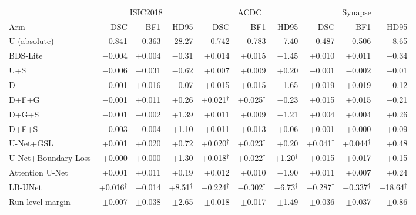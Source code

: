 \begin{tabular}{lrrrrrrrrr}
\toprule
 & \multicolumn{3}{c}{ISIC2018} & \multicolumn{3}{c}{ACDC} & \multicolumn{3}{c}{Synapse} \\
\cmidrule(lr){2-4}\cmidrule(lr){5-7}\cmidrule(lr){8-10}
Arm & DSC & BF1 & HD95 & DSC & BF1 & HD95 & DSC & BF1 & HD95 \\
\midrule
U (absolute) & 0.841 & 0.363 & 28.27 & 0.742 & 0.783 & 7.40 & 0.487 & 0.506 & 8.65 \\
\midrule
BDS-Lite & $-$0.004 & +0.004 & $-$0.31 & +0.014 & +0.015 & $-$1.45 & +0.010 & +0.011 & $-$0.34 \\
\midrule
U+S & $-$0.006 & $-$0.031 & $-$0.62 & +0.007 & +0.009 & +0.20 & $-$0.001 & $-$0.002 & $-$0.01 \\
D & $-$0.001 & +0.016 & $-$0.07 & +0.015 & +0.015 & $-$1.65 & +0.019 & +0.019 & $-$0.12 \\
D+F+G & $-$0.001 & +0.011 & +0.26 & +0.021$^{\dagger}$ & +0.025$^{\dagger}$ & $-$0.23 & +0.015 & +0.015 & $-$0.21 \\
D+G+S & $-$0.001 & $-$0.002 & +1.39 & +0.011 & +0.009 & $-$1.21 & +0.004 & +0.004 & +0.26 \\
D+F+S & $-$0.003 & $-$0.004 & +1.10 & +0.011 & +0.013 & +0.06 & +0.001 & +0.000 & +0.09 \\
\midrule
U-Net+GSL & +0.001 & +0.020 & +0.72 & +0.020$^{\dagger}$ & +0.023$^{\dagger}$ & +0.20 & +0.041$^{\dagger}$ & +0.044$^{\dagger}$ & +0.48 \\
U-Net+Boundary Loss & +0.000 & +0.000 & +1.30 & +0.018$^{\dagger}$ & +0.022$^{\dagger}$ & +1.20$^{\dagger}$ & +0.015 & +0.017 & +0.15 \\
Attention U-Net & +0.001 & +0.011 & +0.19 & +0.012 & +0.010 & $-$1.90 & +0.011 & +0.007 & +0.24 \\
LB-UNet & +0.016$^{\dagger}$ & $-$0.014 & +8.51$^{\dagger}$ & $-$0.224$^{\dagger}$ & $-$0.302$^{\dagger}$ & $-$6.73$^{\dagger}$ & $-$0.287$^{\dagger}$ & $-$0.337$^{\dagger}$ & $-$18.64$^{\dagger}$ \\
\midrule
Run-level margin & $\pm$0.007 & $\pm$0.038 & $\pm$2.65 & $\pm$0.018 & $\pm$0.017 & $\pm$1.49 & $\pm$0.036 & $\pm$0.037 & $\pm$0.86 \\
\bottomrule
\end{tabular}
